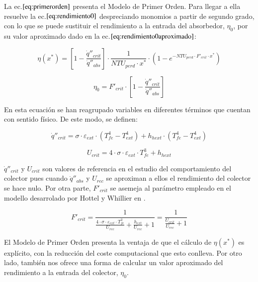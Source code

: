 La ec.\(\eqref{eq:primerorden}\) presenta el Modelo de Primer Orden. Para llegar a ella resuelve la ec.\(\eqref{eq:rendimiento0}\) despreciando monomios a partir de segundo grado, con lo que se puede sustituir el rendimiento a la entrada del absorbedor, \(\eta_{0}\), por su valor aproximado dado en la ec.\(\eqref{eq:rendimiento0aproximado}\):

\begin{equation}
    \eta(x^{*}) = \left[1-\frac{\dot q''_{crit}}{\dot q''_{abs}}\right] \cdot \frac{1}{NTU_{perd} \cdot x^{*}} \cdot \left(1-e^{-NTU_{perd}\cdot F'_{crit}\cdot x^{*}}\right) 
    \label{eq:primerorden}
\end{equation}

\begin{equation}
    \eta_{0} = F'_{crit} \cdot \left[1-\frac{\dot q''_{crit}}{\dot q''_{abs}}\right] 
    \label{eq:rendimiento0aproximado}
\end{equation}

En esta ecuación se han reagrupado variables en diferentes términos que cuentan con sentido físico. De este modo, se definen:

\begin{equation}
    \dot q''_{crit} = \sigma \cdot \varepsilon_{ext} \cdot \left(T^{4}_{fe}- T^{4}_{ext}\right)+h_{hext} \cdot \left(T^{4}_{fe}- T^{4}_{ext}\right)
    \label{eq:qcrit}
\end{equation}

\begin{equation}
    U_{crit} = 4 \cdot \sigma \cdot \varepsilon_{ext} \cdot T^{3}_{fe} + h_{hext}
    \label{eq:ucrit}
\end{equation}

\(\dot q''_{crit}\) y \(U_{crit}\) son valores de referencia en el estudio del comportamiento del colector pues cuando \(\dot q''_{abs}\) y \(U_{rec}\) se aproximan a ellos el rendimiento del colector se hace nulo. Por otra parte, \(F'_{crit}\) se asemeja al parámetro empleado en el modello desarrolado por Hottel y Whillier en \cite{hottelEvaluationFlatplateSolar1955}.

\begin{equation}
    F'_{crit} = \frac{1}{\frac{4 \cdot \sigma \cdot \varepsilon_{ext} \cdot T^{3}_{fe}}{U_{rec}} + \frac{h_{ext}}{U_{rec}} +1} = \frac{1}{\frac{U_{crit}}{U_{rec}}+1}
    \label{eq:fcrit}
\end{equation}

El Modelo de Primer Orden presenta la ventaja de que el cálculo de \(\eta(x^{*})\) es explícito, con la reducción del coste computacional que esto conlleva. Por otro lado, también nos ofrece una forma de calcular un valor aproximado del rendimiento a la entrada del colector, \(\eta_{0}\).

